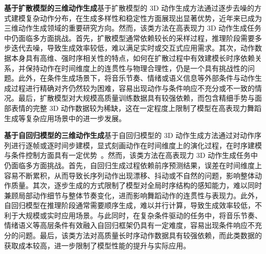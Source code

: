 \noindent\textbf{基于扩散模型的三维动作生成}\quad 基于扩散模型的 3D 动作生成方法通过逐步去噪的方式建模复杂动作分布，在生成多样性和稳定性方面展现出显著优势，近年来已成为三维动作生成领域的重要研究方向。然而，该类方法在高表现力 3D 动作生成任务中仍面临多方面挑战。首先，扩散模型通常依赖较长的采样过程，推理阶段需要多步迭代去噪，导致生成效率较低，难以满足实时或交互式应用需求。其次，动作数据本身具有高维、强时序相关性的特点，如何在扩散过程中有效建模长时序依赖关系，并保持动作在时间维度上的连贯性与物理合理性，仍是一个具有挑战性的问题。此外，在条件生成场景下，将音乐节奏、情绪或语义信息等外部条件与动作生成过程进行精确对齐仍然较为困难，容易出现动作与条件响应不充分或不一致的情况。最后，扩散模型对大规模高质量训练数据具有较强依赖，而包含精细手势与面部表情的完整 3D 动作数据较为稀缺，这在一定程度上限制了模型在高表现力舞蹈生成等复杂应用场景中的进一步发展。

\noindent\textbf{基于自回归模型的三维动作生成}\quad 基于自回归模型的 3D 动作生成方法通过对动作序列进行逐帧或逐时间步建模，显式刻画动作在时间维度上的演化过程，在时序建模与条件控制方面具有一定优势~\cite{siyao2022bailando,li2021ai}。然而，该类方法在高表现力 3D 动作生成任务中仍面临多方面挑战。首先，自回归生成过程依赖前序预测结果，误差在时间维度上容易不断累积，从而导致长序列动作出现漂移、抖动或不自然的问题，影响整体动作质量。其次，逐步生成的方式限制了模型对全局时序结构的感知能力，难以同时兼顾局部动作细节与整体节奏变化，进而影响舞蹈动作的连贯性与表现力。此外，自回归模型在推理阶段通常需要顺序生成，难以并行计算，导致生成效率较低，不利于大规模或实时应用场景。与此同时，在复杂条件驱动的任务中，将音乐节奏、情绪语义等高层条件有效融入自回归框架仍具有一定难度，容易出现条件响应不充分的问题。最后，该类方法对高质量长时序动作数据具有较强依赖，而此类数据的获取成本较高，进一步限制了模型性能的提升与实际应用。






